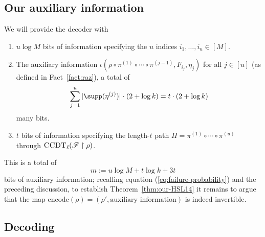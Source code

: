 \documentclass{toc}
\theoremstyle{plain}
\newcommand{\uhr}{\upharpoonright}
\newcommand{\encode}{\mathrm{encode}}
\newcommand{\CCDT}{\textsc{CCDT}}
\begin{document}
\subsection{Our auxiliary information}  
\label{sec:aux}
We will provide the decoder with 
\begin{enumerate}
\item $u \log M$ bits of information specifying the $u$ indices $i_1,\ldots,i_u \in [M]$.
\item  The auxiliary information $\iota(\rho \circ \pi^{(1)}\circ\cdots \circ\pi^{(j-1)}, F_{i_j},\eta_j)$ for all $j\in [u]$ (as defined in Fact~\ref{fact:raz}), a total of 
\[ \sum_{j=1}^u |\supp(\eta^{(j)})| \cdot (2+ \log k) = t \cdot (2 + \log k) \] 
many bits.
\item $t$ bits of information specifying the length-$t$ path $\Pi = \pi^{(1)} \circ \cdots \circ \pi^{(u)}$ through $\CCDT_\ell(\mathscr{F} \uhr \rho)$. 
\end{enumerate} 
This is a total of 
\[ m := u\log M + t\log k + 3t \] 
bits of auxiliary information; recalling equation (\ref{eq:failure-probability}) and the preceding discussion, to establish Theorem~\ref{thm:our-HSL14} it remains to argue that the map $\encode(\rho) = (\rho',\text{auxiliary information})$ is indeed invertible. 

\subsection{Decoding} 
\end{document}
